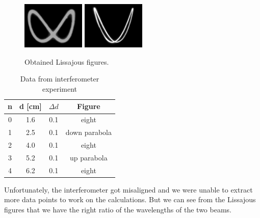 \begin{figure}[h!]
    \centering
    \includegraphics[width = 3cm]{./imagesandplots/lissjous1.jpg}
    \includegraphics[width = 3cm]{./imagesandplots/lissjous2.jpg}
    \caption{Obtained Lissajous figures.}
    \label{fig:lissajous}
\end{figure}

\begin{table}[]
    \centering
    \begin{tabular}{cccc}
        n & d [cm] & $\Delta d$ & Figure \\
        \hline
        0 & 1.6 & 0.1 & eight \\
        1 & 2.5 & 0.1 & down parabola \\
        2 & 4.0 & 0.1 & eight \\
        3 & 5.2 & 0.1 & up parabola \\
        4 & 6.2 & 0.1 & eight
    \end{tabular}
    \caption{Data from interferometer experiment}
    \label{tab:lissajous}
\end{table}
Unfortunately, the interferometer got misaligned and we were unable to extract more data points to work on the calculations. But we can see from the Lissajous figures that we have the right ratio of the wavelengths of the two beams.
